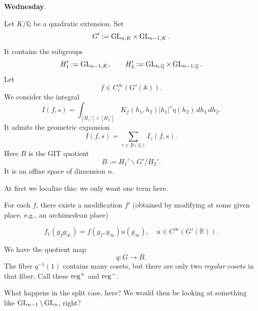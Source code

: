 \documentclass[reqno]{amsart} 
\begin{document}
\textbf{Wednesday}.

Let $K / \mathbb{Q}$ be a quadratic extension.  Set
\begin{equation*}
  G ' := \operatorname{GL}_{n, K} \times \operatorname{GL}_{n - 1, K}.
\end{equation*}
It contains the subgroups
\begin{equation*}
  H_1 ' := \operatorname{GL}_{n - 1, K}, \qquad H_2 ' := \operatorname{GL}_{n, \mathbb{Q}} \times \operatorname{GL}_{n - 1, \mathbb{Q}}.
\end{equation*}
Let
\begin{equation*}
  f \in C_c^\infty(G '(\mathbb{A})).
\end{equation*}
We consider the integral
\begin{equation*}
  I(f, s ) = \int_{[H_1 ' ] \times [H_2 ' ] } K_f(h_1, h_2 ) \lvert h_1  \rvert^s \eta(h_2 ) \, d h_1 \, d h_2.
\end{equation*}
It admits the geometric expansion
\begin{equation*}
  I(f, s) = \sum_{\gamma \in B(\mathbb{Q} )} I_\gamma(f , s).
\end{equation*}
Here $B$ is the GIT quotient
\begin{equation*}
  B := H_1 ' \backslash G ' / H_2 '.
\end{equation*}
It is an affine space of dimension $n$.

At first we localize this: we only want one term here.

For each $f$, there exists a modification $f'$ (obtained by modifying at some given place, e.g., an archimedean place)

\begin{equation*}
  f_1(g_f g _\infty) = f(g_f, g _\infty) u(g _\infty ), \quad u \in C^\infty(G '(\mathbb{R})).
\end{equation*}

We have the quotient map
\begin{equation*}
  q : G \rightarrow B.
\end{equation*}
The fiber $q^{-1}(1)$ contains many cosets, but there are only two \emph{regular} cosets in that fiber.  Call these $\operatorname{reg}^+$ and $\operatorname{reg}^-$.

\begin{remark}\label{remark:cnfg5j17xi}
  What happens in the split case, here?  We would then be looking at something like $\operatorname{GL}_{n-1} \backslash \operatorname{GL}_n$, right?
\end{remark}
\end{document}
